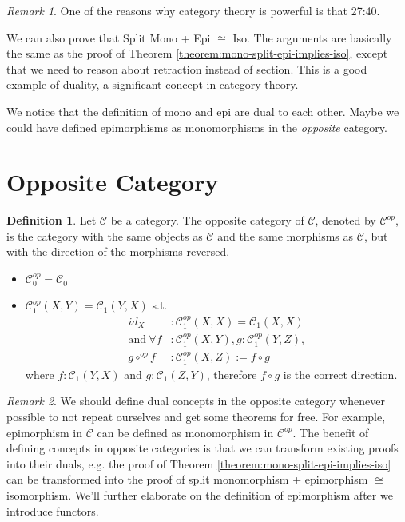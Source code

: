 \documentclass[12pt]{article}
\theoremstyle{plain}
\theoremstyle{definition}
\newtheorem{definition}{Definition}
\theoremstyle{remark}
\newtheorem*{remark}{Remark}
\newcommand{\cat}[1]{\mathcal{#1}}
\begin{document}
\begin{remark}
  One of the reasons why category theory is powerful is that 27:40.
\end{remark}

We can also prove that Split Mono + Epi $\cong$ Iso. The arguments are basically the same as the proof of Theorem \ref{theorem:mono-split-epi-implies-iso}, except that we need to reason about retraction instead of section. This is a good example of duality, a significant concept in category theory.

We notice that the definition of mono and epi are dual to each other. Maybe we could have defined epimorphisms as monomorphisms in the \emph{opposite} category.

\section{Opposite Category}

\begin{definition}
  Let $\cat{C}$ be a category. The opposite category of $\cat{C}$, denoted by $\cat{C}^{op}$, is the category with the same objects as $\cat{C}$ and the same morphisms as $\cat{C}$, but with the direction of the morphisms reversed.
  \begin{itemize}
    \item $\cat{C}^{op}_0 = \cat{C}_0$
    \item $\cat{C}^{op}_1(X, Y) = \cat{C}_1(Y, X)$ s.t. \begin{align*}
      id_X &: \cat{C}^{op}_1(X, X) = \cat{C}_1(X, X) \\
      \text{and}~\forall f &: \cat{C}^{op}_1(X, Y), g : \cat{C}^{op}_1(Y, Z), \\
      g \circ^{op} f &: \cat{C}^{op}_1(X, Z) := f \circ g
    \end{align*}
    where $f : \cat{C}_1(Y, X)$ and $g : \cat{C}_1(Z, Y)$, therefore $f \circ g$ is the correct direction.
  \end{itemize}
\end{definition}

\begin{remark}
  We should define dual concepts in the opposite category whenever possible to not repeat ourselves and get some theorems for free. For example, epimorphism in $\cat{C}$ can be defined as monomorphism in $\cat{C}^{op}$. The benefit of defining concepts in opposite categories is that we can transform existing proofs into their duals, e.g. the proof of Theorem \ref{theorem:mono-split-epi-implies-iso} can be transformed into the proof of split monomorphism + epimorphism $\cong$ isomorphism. We'll further elaborate on the definition of epimorphism after we introduce functors.
\end{remark}
\end{document}
